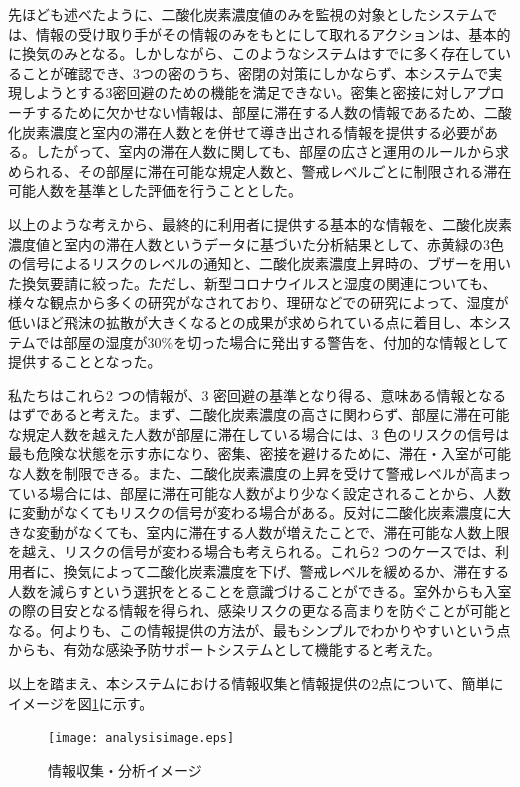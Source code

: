 先ほども述べたように、二酸化炭素濃度値のみを監視の対象としたシステムでは、情報の受け取り手がその情報のみをもとにして取れるアクションは、基本的に換気のみとなる。しかしながら、このようなシステムはすでに多く存在していることが確認でき、3つの密のうち、密閉の対策にしかならず、本システムで実現しようとする3密回避のための機能を満足できない。密集と密接に対しアプローチするために欠かせない情報は、部屋に滞在する人数の情報であるため、二酸化炭素濃度と室内の滞在人数とを併せて導き出される情報を提供する必要がある。したがって、室内の滞在人数に関しても、部屋の広さと運用のルールから求められる、その部屋に滞在可能な規定人数と、警戒レベルごとに制限される滞在可能人数を基準とした評価を行うこととした。

以上のような考えから、最終的に利用者に提供する基本的な情報を、二酸化炭素濃度値と室内の滞在人数というデータに基づいた分析結果として、赤黄緑の3色の信号によるリスクのレベルの通知と、二酸化炭素濃度上昇時の、ブザーを用いた換気要請に絞った。ただし、新型コロナウイルスと湿度の関連についても、様々な観点から多くの研究がなされており、理研などでの研究によって、湿度が低いほど飛沫の拡散が大きくなるとの成果が求められている点に着目し、本システムでは部屋の湿度が30\%を切った場合に発出する警告を、付加的な情報として提供することとなった。

私たちはこれら2 つの情報が、3 密回避の基準となり得る、意味ある情報となるはずであると考えた。まず、二酸化炭素濃度の高さに関わらず、部屋に滞在可能な規定人数を越えた人数が部屋に滞在している場合には、3 色のリスクの信号は最も危険な状態を示す赤になり、密集、密接を避けるために、滞在・入室が可能な人数を制限できる。また、二酸化炭素濃度の上昇を受けて警戒レベルが高まっている場合には、部屋に滞在可能な人数がより少なく設定されることから、人数に変動がなくてもリスクの信号が変わる場合がある。反対に二酸化炭素濃度に大きな変動がなくても、室内に滞在する人数が増えたことで、滞在可能な人数上限を越え、リスクの信号が変わる場合も考えられる。これら2 つのケースでは、利用者に、換気によって二酸化炭素濃度を下げ、警戒レベルを緩めるか、滞在する人数を減らすという選択をとることを意識づけることができる。室外からも入室の際の目安となる情報を得られ、感染リスクの更なる高まりを防ぐことが可能となる。何よりも、この情報提供の方法が、最もシンプルでわかりやすいという点からも、有効な感染予防サポートシステムとして機能すると考えた。

以上を踏まえ、本システムにおける情報収集と情報提供の2点について、簡単にイメージを図\ref{analysisimage}に示す。

\begin{figure}[H]
	\centering
	\texttt{[image: analysisimage.eps]}
	\caption{情報収集・分析イメージ}
	\label{analysisimage}
\end{figure}

